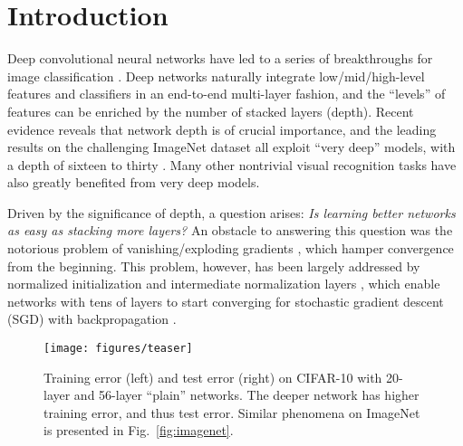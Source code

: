 

\vspace{-1em}
\section{Introduction}
\label{sec:intro}

Deep convolutional neural networks \cite{LeCun1989,Krizhevsky2012} have led to a series of breakthroughs for image classification \cite{Krizhevsky2012,Zeiler2014,Sermanet2014}. Deep networks naturally integrate low/mid/high-level features \cite{Zeiler2014} and classifiers in an end-to-end multi-layer fashion, and the ``levels'' of features can be enriched by the number of stacked layers (depth).
Recent evidence \cite{Simonyan2015,Szegedy2015} reveals that network depth is of crucial importance, and the leading results \cite{Simonyan2015,Szegedy2015,He2015,Ioffe2015} on the challenging ImageNet dataset \cite{Russakovsky2014} all exploit ``very deep'' \cite{Simonyan2015} models, with a depth of sixteen \cite{Simonyan2015} to thirty \cite{Ioffe2015}. Many other nontrivial visual recognition tasks \cite{Girshick2014,He2014,Girshick2015,Ren2015,Long2015} have also greatly benefited from very deep models.

Driven by the significance of depth, a question arises: \emph{Is learning better networks as easy
as stacking more layers?}
An obstacle to answering this question was the notorious problem of vanishing/exploding gradients \cite{Bengio1994,Glorot2010}, which hamper convergence from the beginning. This problem, however, has been largely addressed by normalized initialization \cite{LeCun1998,Glorot2010,Saxe2013,He2015} and intermediate normalization layers \cite{Ioffe2015}, which enable networks with tens of layers to start converging for stochastic gradient descent (SGD) with backpropagation \cite{LeCun1989}.

\begin{figure}[t]
\begin{center}
\texttt{[image: figures/teaser]}
\end{center}
\vspace{-1.2em}
\caption{Training error (left) and test error (right) on CIFAR-10 with 20-layer and 56-layer ``plain'' networks. The deeper network has higher training error, and thus test error. Similar phenomena on ImageNet is presented in Fig.~\ref{fig:imagenet}.}
\label{fig:teaser}
\vspace{-1em}
\end{figure}

